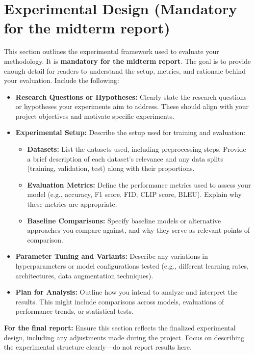 \documentclass{article}
\begin{document}
\section{Experimental Design (Mandatory for the midterm report)}

This section outlines the experimental framework used to evaluate your methodology. It is \textbf{mandatory for the midterm report}. The goal is to provide enough detail for readers to understand the setup, metrics, and rationale behind your evaluation. Include the following:

\begin{itemize}
    \item \textbf{Research Questions or Hypotheses:} Clearly state the research questions or hypotheses your experiments aim to address. These should align with your project objectives and motivate specific experiments.

    \item \textbf{Experimental Setup:} Describe the setup used for training and evaluation:
    \begin{itemize}
        \item \textbf{Datasets:} List the datasets used, including preprocessing steps. Provide a brief description of each dataset's relevance and any data splits (training, validation, test) along with their proportions.
        \item \textbf{Evaluation Metrics:} Define the performance metrics used to assess your model (e.g., accuracy, F1 score, FID, CLIP score, BLEU). Explain why these metrics are appropriate.
        \item \textbf{Baseline Comparisons:} Specify baseline models or alternative approaches you compare against, and why they serve as relevant points of comparison.
    \end{itemize}

    \item \textbf{Parameter Tuning and Variants:} Describe any variations in hyperparameters or model configurations tested (e.g., different learning rates, architectures, data augmentation techniques).

    \item \textbf{Plan for Analysis:} Outline how you intend to analyze and interpret the results. This might include comparisons across models, evaluations of performance trends, or statistical tests.
\end{itemize}

\textbf{For the final report:} Ensure this section reflects the finalized experimental design, including any adjustments made during the project. Focus on describing the experimental structure clearly---do not report results here.
\end{document}

